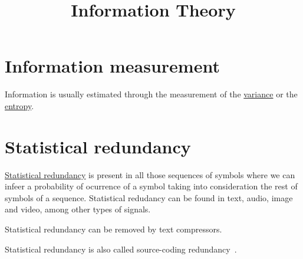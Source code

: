 
\title{Information Theory}
\maketitle

\tableofcontents

\section{Information measurement}
Information is usually estimated through the measurement of the
\href{https://en.wikipedia.org/wiki/Variance}{variance} or the
\href{https://en.wikipedia.org/wiki/Entropy}{entropy}.


\section{Statistical redundancy}
\href{https://en.wikipedia.org/wiki/Redundancy_(information_theory)}{Statistical
  redundancy} is present in all those sequences of symbols where we
can infeer a probability of ocurrence of a symbol taking into
consideration the rest of symbols of a sequence. Statistical redudancy
can be found in text, audio, image and video, among other types of
signals.

Statistical redundancy can be removed by text compressors.

Statistical redundancy is also called source-coding redundancy~\cite{kondoz2009visual}.

